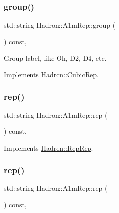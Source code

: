 \subsubsection{\texorpdfstring{group()}{group()}\hspace{0.1cm}{\footnotesize\ttfamily [3/3]}}
{\footnotesize\ttfamily std\+::string Hadron\+::\+A1m\+Rep\+::group (\begin{DoxyParamCaption}{ }\end{DoxyParamCaption}) const\hspace{0.3cm}{\ttfamily [inline]}, {\ttfamily [virtual]}}

Group label, like Oh, D2, D4, etc. 

Implements \mbox{\hyperlink{structHadron_1_1CubicRep_a0748f11ec87f387062c8e8981339a29c}{Hadron\+::\+Cubic\+Rep}}.

\mbox{\label{structHadron_1_1A1mRep_a99e7f10bdf161f356d1061172d776f41}} 
\subsubsection{\texorpdfstring{rep()}{rep()}\hspace{0.1cm}{\footnotesize\ttfamily [1/5]}}
{\footnotesize\ttfamily std\+::string Hadron\+::\+A1m\+Rep\+::rep (\begin{DoxyParamCaption}{ }\end{DoxyParamCaption}) const\hspace{0.3cm}{\ttfamily [inline]}, {\ttfamily [virtual]}}



Implements \mbox{\hyperlink{structHadron_1_1RepRep_ab3213025f6de249f7095892109575fde}{Hadron\+::\+Rep\+Rep}}.

\mbox{\label{structHadron_1_1A1mRep_a99e7f10bdf161f356d1061172d776f41}} 
\subsubsection{\texorpdfstring{rep()}{rep()}\hspace{0.1cm}{\footnotesize\ttfamily [2/5]}}
{\footnotesize\ttfamily std\+::string Hadron\+::\+A1m\+Rep\+::rep (\begin{DoxyParamCaption}{ }\end{DoxyParamCaption}) const\hspace{0.3cm}{\ttfamily [inline]}, {\ttfamily [virtual]}}



